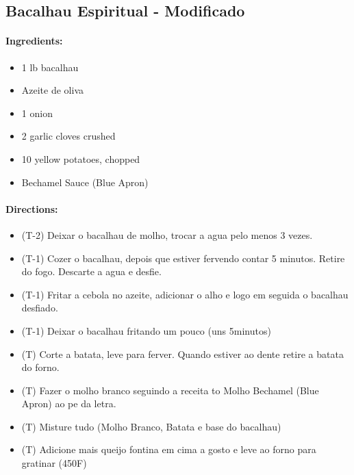 \documentclass{article}
\begin{document}
\subsection{Bacalhau Espiritual - Modificado}

\paragraph{Ingredients:}
\begin{itemize}
    \item 1 lb bacalhau
    \item Azeite de oliva
    \item 1 onion
    \item 2 garlic cloves crushed
    \item 10 yellow potatoes, chopped
    \item Bechamel Sauce (Blue Apron)
\end{itemize}

\paragraph{Directions:}
\begin{itemize}
    \item (T-2) Deixar o bacalhau de molho, trocar a agua pelo menos 3 vezes.
    \item (T-1) Cozer o bacalhau, depois que estiver fervendo contar 5 minutos. Retire do fogo. Descarte a agua e desfie.
    \item (T-1) Fritar a cebola no azeite, adicionar o alho e logo em seguida o bacalhau desfiado.
    \item (T-1) Deixar o bacalhau fritando um pouco (uns 5minutos)
    \item (T) Corte a batata, leve para ferver. Quando estiver ao dente retire a batata do forno.
    \item (T) Fazer o molho branco seguindo a receita to Molho Bechamel (Blue Apron) ao pe da letra.
    \item (T) Misture tudo (Molho Branco, Batata e base do bacalhau)
    \item (T) Adicione mais queijo fontina em cima a gosto e leve ao forno para gratinar (450F)
\end{itemize}
\end{document}
